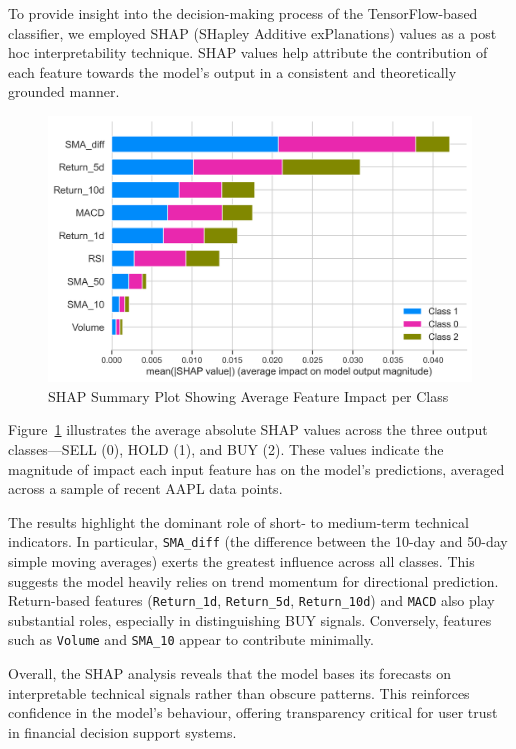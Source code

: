 To provide insight into the decision-making process of the TensorFlow-based classifier, we employed SHAP (SHapley Additive exPlanations) values as a post hoc interpretability technique. SHAP values help attribute the contribution of each feature towards the model’s output in a consistent and theoretically grounded manner.

\begin{figure}[h]
  \centering
  \includegraphics[width=0.8\linewidth]{assets/shap_summary_bar.png}
  \caption{SHAP Summary Plot Showing Average Feature Impact per Class}
  \label{fig:shap_summary}
\end{figure}

Figure~\ref{fig:shap_summary} illustrates the average absolute SHAP values across the three output classes—SELL (0), HOLD (1), and BUY (2). These values indicate the magnitude of impact each input feature has on the model's predictions, averaged across a sample of recent AAPL data points.

The results highlight the dominant role of short- to medium-term technical indicators. In particular, \texttt{SMA\_diff} (the difference between the 10-day and 50-day simple moving averages) exerts the greatest influence across all classes. This suggests the model heavily relies on trend momentum for directional prediction. Return-based features (\texttt{Return\_1d}, \texttt{Return\_5d}, \texttt{Return\_10d}) and \texttt{MACD} also play substantial roles, especially in distinguishing BUY signals. Conversely, features such as \texttt{Volume} and \texttt{SMA\_10} appear to contribute minimally.

Overall, the SHAP analysis reveals that the model bases its forecasts on interpretable technical signals rather than obscure patterns. This reinforces confidence in the model's behaviour, offering transparency critical for user trust in financial decision support systems.

